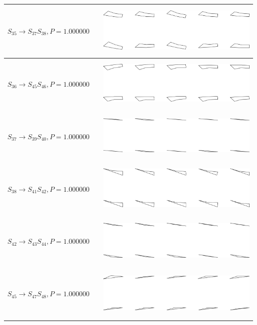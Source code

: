 \begin{tabular}{|l|c|c|}

\hline
$S_{35} \to S_{37} S_{38}, P=1.000000$ &  & \includegraphics[height=1in]{output/1.models/hand_built/romerchoice/gram.0018.sample.png} \\
\hline
$S_{36} \to S_{45} S_{46}, P=1.000000$ &  & \includegraphics[height=1in]{output/1.models/hand_built/romerchoice/gram.0019.sample.png} \\
\hline
$S_{37} \to S_{39} S_{40}, P=1.000000$ &  & \includegraphics[height=1in]{output/1.models/hand_built/romerchoice/gram.0020.sample.png} \\
\hline
$S_{38} \to S_{41} S_{42}, P=1.000000$ &  & \includegraphics[height=1in]{output/1.models/hand_built/romerchoice/gram.0021.sample.png} \\
\hline
$S_{42} \to S_{43} S_{44}, P=1.000000$ &  & \includegraphics[height=1in]{output/1.models/hand_built/romerchoice/gram.0022.sample.png} \\
\hline
$S_{45} \to S_{47} S_{48}, P=1.000000$ &  & \includegraphics[height=1in]{output/1.models/hand_built/romerchoice/gram.0023.sample.png} \\
\hline
\end{tabular}

